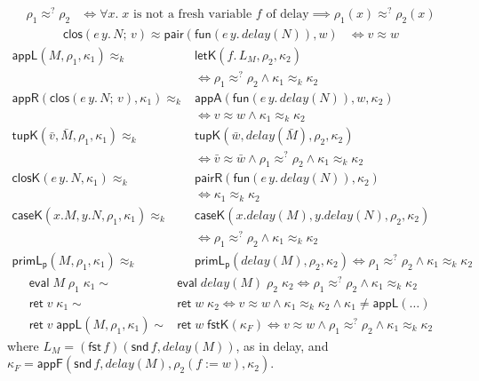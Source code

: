 \documentclass[10pt]{article}
\theoremstyle{acmplain}
\newcommand{\key}[1]{\mathsf{#1}}
\newcommand{\pass}[1]{\mathit{#1}}
\newcommand{\FST}{\key{fst}\,}
\newcommand{\SND}{\key{snd}\,}
\newcommand{\ext}[3]{#1(#2{:=}#3)}
\newcommand{\ev}[3]{\key{eval}\;#1\;#2\;#3}
\newcommand{\rt}[2]{\key{ret}\;#1\;#2}
\newcommand{\closV}[2]{\key{clos}(#1;\, #2)}
\newcommand{\pairV}[2]{\key{pair}(#1, #2)}
\newcommand{\funV}[1]{\key{fun}(#1)}
\newcommand{\Kf}[2]{\key{#1}(#2)}
\newcommand{\approxk}{\approx_k}
\newcommand{\approxq}{\approx^{?}}
\begin{document}
\begin{align*}
  \rho_1 \approxq \rho_2 &\iff \forall x.\; x \text{ is not a fresh variable } f \text{ of delay}
    \implies \rho_1(x) \approxq \rho_2(x)
\end{align*}
\begin{align*}
  \closV{e\, y.\, N}{v} \approx \pairV{\funV{e\, y.\, \pass{delay}(N)}}{w} &\iff v \approx w
\end{align*}
\begin{align*}
  \Kf{appL}{M, \rho_1, \kappa_1} \approxk {}& \Kf{letK}{f.\,L_M, \rho_2, \kappa_2} \\
    &\iff \rho_1 \approxq \rho_2 \land \kappa_1 \approxk \kappa_2 \\
  \Kf{appR}{\closV{e\, y.\, N}{v}, \kappa_1} \approxk {}& \Kf{appA}{\funV{e\, y.\, \pass{delay}(N)}, w, \kappa_2} \\
    &\iff v \approx w \land \kappa_1 \approxk \kappa_2 \\
  \Kf{tupK}{\bar{v}, \bar{M}, \rho_1, \kappa_1} \approxk {}& \Kf{tupK}{\bar{w}, \pass{delay}(\bar{M}), \rho_2, \kappa_2} \\
    &\iff \bar{v} \approx \bar{w} \land \rho_1 \approxq \rho_2 \land \kappa_1 \approxk \kappa_2 \\
  \Kf{closK}{e\, y.\, N, \kappa_1} \approxk {}& \Kf{pairR}{\funV{e\, y.\, \pass{delay}(N)}, \kappa_2} \\
    &\iff \kappa_1 \approxk \kappa_2 \\
  \Kf{caseK}{x.M, y.N, \rho_1, \kappa_1} \approxk {}& \Kf{caseK}{x.\pass{delay}(M), y.\pass{delay}(N), \rho_2, \kappa_2} \\
    &\iff \rho_1 \approxq \rho_2 \land \kappa_1 \approxk \kappa_2 \\
  \Kf{primL_p}{M, \rho_1, \kappa_1} \approxk {}& \Kf{primL_p}{\pass{delay}(M), \rho_2, \kappa_2}
    \iff \rho_1 \approxq \rho_2 \land \kappa_1 \approxk \kappa_2
\end{align*}
\begin{align*}
  \ev{M}{\rho_1}{\kappa_1} \sim {}& \ev{\pass{delay}(M)}{\rho_2}{\kappa_2}
    \iff \rho_1 \approxq \rho_2 \land \kappa_1 \approxk \kappa_2 \\
  \rt{v}{\kappa_1} \sim {}& \rt{w}{\kappa_2}
    \iff v \approx w \land \kappa_1 \approxk \kappa_2 \land \kappa_1 \neq \Kf{appL}{\ldots} \\
  \rt{v}{\Kf{appL}{M, \rho_1, \kappa_1}} \sim {}& \rt{w}{\Kf{fstK}{\kappa_F}}
    \iff v \approx w \land \rho_1 \approxq \rho_2 \land \kappa_1 \approxk \kappa_2
\end{align*}
where $L_M = (\FST f)(\SND f, \pass{delay}(M))$, as in delay, and
$\kappa_F = \Kf{appF}{\SND f, \pass{delay}(M), \ext{\rho_2}{f}{w}, \kappa_2}$.
\end{document}
